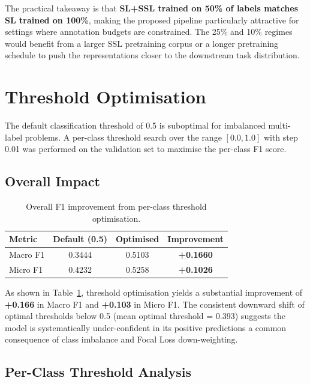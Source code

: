The practical takeaway is that \textbf{SL+SSL trained on 50\% of labels matches SL trained on 100\%}, making the proposed pipeline particularly attractive for settings where annotation budgets are constrained. The 25\% and 10\% regimes would benefit from a larger SSL pretraining corpus or a longer pretraining schedule to push the representations closer to the downstream task distribution.

\section{Threshold Optimisation}
\label{sec:threshold}

The default classification threshold of 0.5 is suboptimal for imbalanced multi-label problems. A per-class threshold search over the range $[0.0, 1.0]$ with step 0.01 was performed on the validation set to maximise the per-class F1 score.

\subsection{Overall Impact}

\begin{table}[ht]
\centering
\caption{Overall F1 improvement from per-class threshold optimisation.}
\label{tab:threshold_overall}
\renewcommand{\arraystretch}{1.3}
\begin{tabular}{lccc}
\toprule
\textbf{Metric} & \textbf{Default (0.5)} & \textbf{Optimised} & \textbf{Improvement} \\
\midrule
Macro F1 & 0.3444 & 0.5103 & \textbf{+0.1660} \\
Micro F1 & 0.4232 & 0.5258 & \textbf{+0.1026} \\
\bottomrule
\end{tabular}
\end{table}

As shown in Table~\ref{tab:threshold_overall}, threshold optimisation yields a substantial improvement of \textbf{+0.166} in Macro F1 and \textbf{+0.103} in Micro F1. The consistent downward shift of optimal thresholds below 0.5 (mean optimal threshold = 0.393) suggests the model is systematically under-confident in its positive predictions a common consequence of class imbalance and Focal Loss down-weighting.

\subsection{Per-Class Threshold Analysis}

